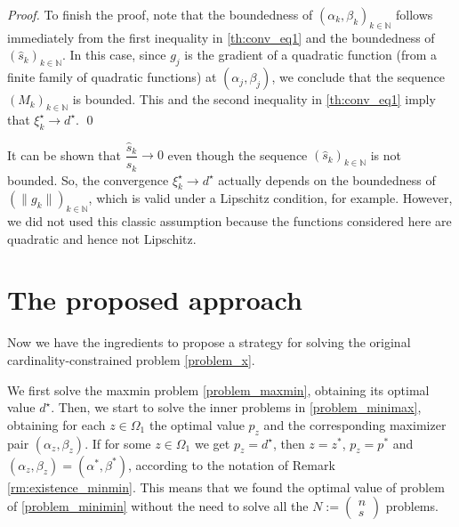 \documentclass[smallextended,referee,envcountsect]{svjour3}
\newcommand{\N}{\mathbb{N}}
\begin{document}
\begin{proof}
To finish the proof, note that the boundedness of $(\alpha_k,\beta_k)_{k\in\N}$ follows 
immediately from the first inequality in \eqref{th:conv_eq1} and the boundedness of 
$(\hat{s}_k)_{k\in\N}$. In this case, since $g_j$ is the gradient of a quadratic function 
(from a finite family of quadratic functions) at $(\alpha_j,\beta_j)$, we conclude that 
the sequence $(M_k)_{k\in\N}$ is bounded. This and the second inequality 
in \eqref{th:conv_eq1} imply that $\xi_k^\star\to d^\star$.
\qed\end{proof}

\begin{remark}
\label{rm:stepsize}
It can be shown that $\dfrac{\hat{s}_k}{s_k}\to 0$ even though the sequence 
$(\hat{s}_k)_{k\in\N}$ is not bounded. So, the convergence $\xi_k^\star\to d^\star$ 
actually depends on the boundedness of $(\|g_k\|)_{k\in\N}$, which is valid under a 
Lipschitz condition, for example. However, we did not used this classic assumption 
because the functions considered here are quadratic and hence not Lipschitz.
\end{remark}


\section{The proposed approach}
\label{sec:proposed_approach}
Now we have the ingredients to propose a strategy for solving the original 
cardinality-constrained problem \eqref{problem_x}. 

We first solve the maxmin problem \eqref{problem_maxmin}, obtaining its optimal 
value $d^\star$. Then, we start to solve the inner problems 
in \eqref{problem_minimax}, obtaining for each $z\in\Omega_1$ the optimal value $p_z$ 
and the corresponding maximizer pair $(\alpha_z,\beta_z)$. If for some $z\in\Omega_1$ 
we get $p_z=d^\star$, then $z=z^*$, $p_z=p^*$ and $(\alpha_z,\beta_z)=(\alpha^*,\beta^*)$, 
according to the notation of Remark \ref{rm:existence_minmin}. This means that we 
found the optimal value of problem of \eqref{problem_minimin} without the need to solve 
all the $N:=\left(\begin{array}{c} n \\ s \end{array}\right)$ problems. 
\end{document}
